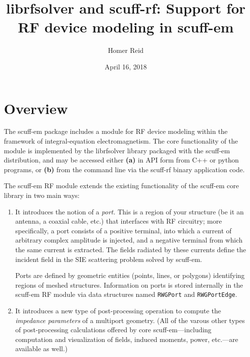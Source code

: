 \documentclass[letterpaper]{article}
\title {{\sc librfsolver} and {\sc scuff-rf}: Support for
        RF device modeling in {\sc scuff-em}}
\author {Homer Reid}
\date {April 16, 2018}
\begin{document}
\pagestyle{myheadings}
\maketitle

\tableofcontents

\section{Overview}

The {\sc scuff-em} package includes a module for RF device modeling
within the framework of integral-equation electromagnetism.
The core functionality of the module is implemented 
by the {\sc librfsolver} library packaged with the {\sc scuff-em}
distribution, and may be accessed either \textbf{(a)} in API form 
from C++ or python programs, or \textbf{(b)} from the command line
via the {\sc scuff-rf} binary application code.

The {\sc scuff-em} RF module extends the existing functionality of the
{\sc scuff-em} core library in two main ways:

\begin{enumerate}
  \item It introduces the notion of a \textit{port.} This is a region
        of your structure (be it an antenna, a coaxial cable, etc.)
        that interfaces with RF circuitry; more specifically, a port
        consists of a positive terminal, into which a current of arbitrary
        complex amplitude is injected,
        and a negative terminal from which the same current is extracted.
        The fields radiated by these currents define the incident field
        in the SIE scattering problem solved by {\sc scuff-em}.

        Ports are defined by geometric entities (points, lines, or
        polygons) identifying regions of meshed structures.
        Information on ports is stored internally in the {\sc scuff-em}
        RF module via data structures named \texttt{RWGPort} and 
        \texttt{RWGPortEdge}.
  \item It introduces a new type of post-processing operation
        to compute the \textit{impedance parameters} of a multiport geometry.
        (All of the varous other types of post-processing calculations offered by
        core {\sc scuff-em}---including computation and visualization of fields,
        induced moments, power, etc.---are available as well.)
\end{enumerate}
\end{document}
